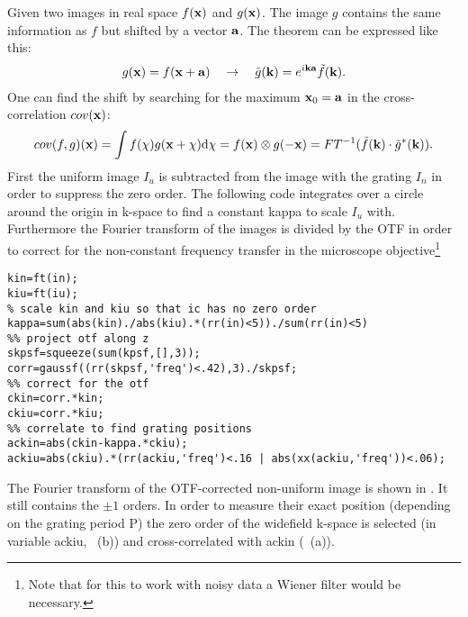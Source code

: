 Given two images in real space $f(\mathbf{x})$ and $g(\mathbf{x})$. The
image $g$ contains the same information as $f$ but shifted by a vector
$\mathbf{a}$. The theorem can be expressed like this:
\begin{align}
  g(\mathbf{x})=f(\mathbf{x}+\mathbf{a})
  \quad
  \rightarrow
  \quad
  \tilde g(\mathbf{k})=e^{i\mathbf{k}\mathbf{a}}\tilde f(\mathbf{k}).
\end{align}
One can find the shift by searching for the maximum $\mathbf{x}_0=\mathbf{a}$ in
the cross-correlation $cov(\mathbf{x})$:
\begin{align}
  cov(f,g)(\mathbf{x})
  =\int f(\mathbf{\chi}) g(\mathbf{x}+\mathbf{\chi}) \textrm{d}\mathbf{\chi}
  =f(\mathbf{x})\otimes g(-\mathbf{x})
  =FT^{-1}(\tilde f(\mathbf{k})\cdot\tilde g^*(\mathbf{k})).
\end{align}
First the uniform image $I_u$ is subtracted from the image with the
grating $I_n$ in order to suppress the zero order. The following code
integrates over a circle around the origin in k-space to find a
constant {\sf kappa} to scale $I_u$ with. Furthermore the
Fourier transform of the images is divided by the OTF in order to
correct for the non-constant frequency transfer in the microscope
objective\footnote{Note that for this to work with noisy data a
  Wiener filter would be necessary.}
\begin{lstlisting}
kin=ft(in);
kiu=ft(iu);
% scale kin and kiu so that ic has no zero order
kappa=sum(abs(kin)./abs(kiu).*(rr(in)<5))./sum(rr(in)<5)
%% project otf along z
skpsf=squeeze(sum(kpsf,[],3));
corr=gaussf((rr(skpsf,'freq')<.42),3)./skpsf;
%% correct for the otf
ckin=corr.*kin;
ckiu=corr.*kiu;
%% correlate to find grating positions
ackin=abs(ckin-kappa.*ckiu);
ackiu=abs(ckiu).*(rr(ackiu,'freq')<.16 | abs(xx(ackiu,'freq'))<.06);
\end{lstlisting}
The Fourier transform of the OTF-corrected non-uniform image is shown
in . It still contains the $\pm1$ orders. In order
to measure their exact position (depending on the grating period {\sf
  P}) the zero order of the widefield k-space is selected (in variable
{\sf ackiu}, ~(b)) and cross-correlated with {\sf
  ackin} (~(a)).

